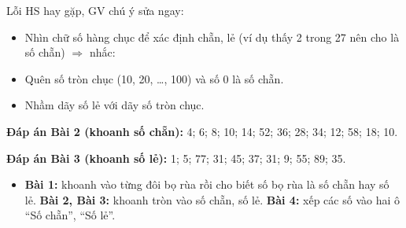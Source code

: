 \documentclass[../main.tex]{subfiles}
\begin{document}
\begin{luuy}
    Lỗi HS hay gặp, GV chú ý sửa ngay:
    \begin{itemize}
        \item Nhìn chữ số hàng chục để xác định chẵn, lẻ (ví dụ thấy 2 trong 27 nên cho là số chẵn) $\Rightarrow$ nhắc: 
        \item Quên số tròn chục (10, 20, \dots, 100) và số 0 là số chẵn.
        \item Nhầm dãy số lẻ với dãy số tròn chục.
    \end{itemize}
    \textbf{Đáp án Bài 2 (khoanh số chẵn):} 4; 6; 8; 10; 14; 52; 36; 28; 34; 12; 58; 18; 10.\par
    \textbf{Đáp án Bài 3 (khoanh số lẻ):} 1; 5; 77; 31; 45; 37; 31; 9; 55; 89; 35.
\end{luuy}
\begin{itemize}
    \item \textbf{Bài 1:} khoanh vào từng đôi bọ rùa rồi cho biết số bọ rùa là số chẵn hay số lẻ. \textbf{Bài 2, Bài 3:} khoanh tròn vào số chẵn, số lẻ. \textbf{Bài 4:} xếp các số vào hai ô “Số chẵn”, “Số lẻ”.
\end{itemize}

\end{document}
